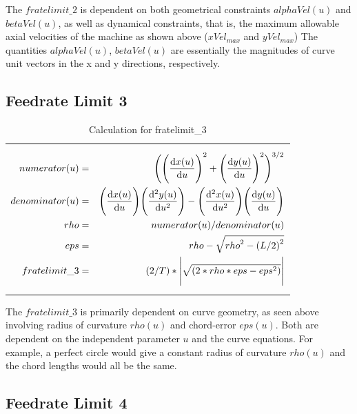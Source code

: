 The $fratelimit\_2$ is dependent on both geometrical constraints $alphaVel(u)$ and $betaVel(u)$, as well as dynamical constraints, that is, the maximum allowable axial velocities of the machine as shown above ($xVel_{max}$ and $yVel_{max}$) The quantities $alphaVel(u)$, $betaVel(u)$ are essentially the magnitudes of curve unit vectors in the x and y directions, respectively. 

\subsection{Feedrate Limit 3}

\begin{table}[ht]
\begin{center}
\begin{tabular}{ p{14.0cm} }
\caption{Calculation for fratelimit\_3}
\begin{eqnarray}
numerator(u) & = & \Bigg ( \Bigg ({\odv{x(u)}{u}} \Bigg )^{2} + \Bigg ({\odv{y(u)}{u}}\Bigg )^{2} \Bigg ) ^{3/2}  \nonumber \\
denominator(u) & = & \Bigg(\odv{x(u)}{u}\Bigg)\Bigg(\frac{\mathrm{d^2}y(u)}{\mathrm{d}u^2}\Bigg) - \Bigg(\frac{\mathrm{d^2}x(u)}{\mathrm{d}u^2}\Bigg)\Bigg(\odv{y(u)}{u}\Bigg)  \nonumber \\
rho & = & numerator(u)/denominator(u) \nonumber \\
eps & = & rho - \sqrt{{rho}^{2} - {(L/2)}^{2}} \nonumber \\
fratelimit\_3 & = & (2/T)* \Bigg | \sqrt{( 2*rho*eps - eps^{2})} \Bigg | \nonumber 
\end{eqnarray}
\end{tabular}
\end{center}
\end{table}

The $fratelimit\_3$ is primarily dependent on curve geometry, as seen above involving radius of curvature $rho(u)$ and chord-error $eps(u)$. Both are dependent on the independent parameter $u$ and the curve equations. For example, a perfect circle would give a constant radius of curvature $rho(u)$ and the chord lengths would all be the same.\\

\clearpage
\pagebreak

\subsection{Feedrate Limit 4}

